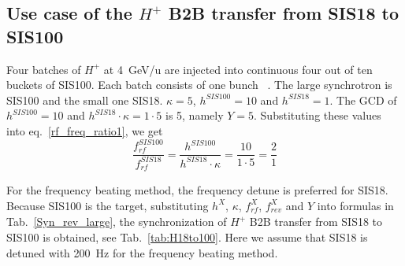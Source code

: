 %
%
\subsection{Use case of the $H^{+}$ B2B transfer from SIS18 to SIS100}
Four batches of $H^{+}$ at \SI{4}{GeV/\atomicmassunit} are injected into continuous four out of ten buckets of SIS100. Each batch consists of one bunch ~\cite{liebermann_fair_2013, liebermann_sis100_2013}. The large synchrotron is SIS100 and the small one SIS18. $\kappa=5$, $h^{\mathit{SIS100}}=10$ and $h^{\mathit{SIS18}}=1$. The GCD of $h^{\mathit{SIS100}}=10$ and $h^{\mathit{SIS18}} \cdot \kappa=1\cdot 5$ is 5, namely $Y=5$. Substituting these values into eq.~\ref{rf_freq_ratio1}, we get
\begin{equation}
\frac{f_{\mathit{rf}}^{\mathit{SIS100}}}{f_{\mathit{rf}}^{\mathit{SIS18}}}= \frac {h^{\mathit{SIS100}}}{h^{\mathit{SIS18}} \cdot \kappa}= \frac{10}{1 \cdot 5}=\frac{2}{1}
\end{equation}

For the frequency beating method, the frequency detune is preferred for SIS18. Because SIS100 is the target, substituting $h^X$, $\kappa$, $f_{\mathit{rf}}^{X}$, $f_{\mathit{rev}}^{X}$ and $Y$ into formulas in Tab.~\ref{Syn_rev_large}, the synchronization of $H^{+}$ B2B transfer from SIS18 to SIS100 is obtained, see Tab.~\ref{tab:H18to100}. Here we assume that SIS18 is detuned with \SI{200}{Hz} for the frequency beating method. 

